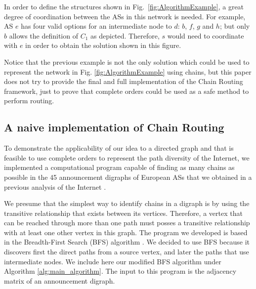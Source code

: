 \documentclass[5p,twocolumn]{elsarticle}
\begin{document}
In order to define the structures shown in Fig.\ \ref{fig:AlgorithmExample}, a great degree of coordination between the ASs in this network is needed. For example, AS $e$ has four valid options for an intermediate node to $d$: $b$, $f$, $g$ and $h$; but only $b$ allows the definition of $C_1$ as depicted. Therefore, $s$ would need to coordinate with $e$ in order to obtain the solution shown in this figure.

Notice that the previous example is not the only solution which could be used to represent the network in Fig. \ref{fig:AlgorithmExample} using chains, but this paper does not try to provide the final and full implementation of the Chain Routing framework, just to prove that complete orders could be used as a safe method to perform routing.


\subsection{A naive implementation of Chain Routing}\label{experiment}

To demonstrate the applicability of our idea to a directed graph and that is feasible to use complete orders to represent the path diversity of the Internet, we implemented a computational program capable of finding as many chains as possible in the 45 announcement digraphs of European ASs that we obtained in a previous analysis of the Internet \cite{Arjona-Villicana2010, Arjona-Villicana2009}.

We presume that the simplest way to identify chains in a digraph is by using the transitive relationship that exists between its vertices. Therefore, a vertex that can be reached through more than one path must posses a transitive relationship with at least one other vertex in this graph. The program we developed is based in the Breadth-First Search (BFS) algorithm \cite{Bang-Jensen2002}. We decided to use BFS because it discovers first the direct paths from a source vertex, and later the paths that use intermediate nodes. We include here our modified BFS algorithm under Algorithm \ref{alg:main_algorithm}. The input to this program is the adjacency matrix of an announcement digraph.
\end{document}
